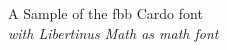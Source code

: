 \documentclass[11pt]{article}
\begin{document}
{\LARGE \noindent A Sample of the fbb Cardo font}\\

{\large \noindent \textit{with Libertinus Math as math font}}\\[5pt]


\end{document}

